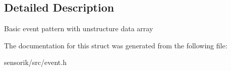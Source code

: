 \subsection{Detailed Description}
Basic event pattern with unstructure data array 

The documentation for this struct was generated from the following file\+:\begin{DoxyCompactItemize}
\item 
sensorik/src/event.\+h\end{DoxyCompactItemize}
